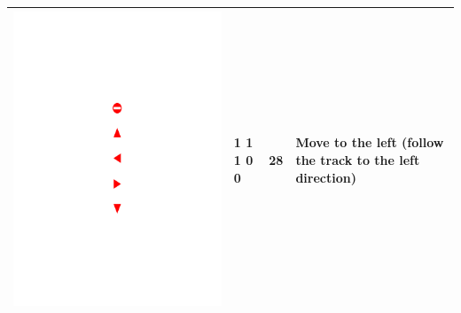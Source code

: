 \documentclass{svproc}
\begin{document}
\begin{table}[!h]
\begin{tabular}{|C{3cm}|C{1.5cm}|C{3cm}|C{4cm}|}
		\begin{minipage}{.075\textwidth}\includegraphics[scale=.5,trim=9.1cm 13.5cm 9.5cm 13cm,clip]{signs.pdf}\end{minipage}		& 1 1 1 0 0 & 28 & Move to the left (follow the track to the left direction) \\ \hline

\end{tabular}
\end{table}
\end{document}
